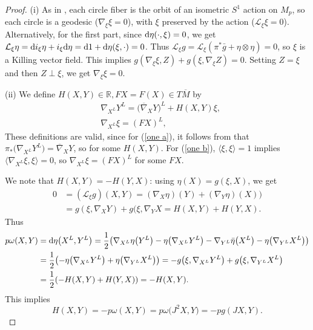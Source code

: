 \documentclass[10pt,a4paper]{amsart}
\numberwithin{equation}{section}
\theoremstyle{definition}
\newcommand{\BbR}{{\mathbb R}}
\newcommand{\R}{\BbR}
\newcommand{\bn}{\nabla}
\newcommand{\bxi}{\xi}
\newcommand{\bgg}{\bar g}
\newcommand{\bg}{ g}
\newcommand{\bx}{X}
\newcommand{\by}{Y}
\newcommand{\xl}{X^L}
\newcommand{\yl}{Y^L}
\newcommand{\om}{\overline{M}}
\newcommand{\omp}{M_p}
\begin{document}
\begin{proof}
(i) As in \cite[Section~3.2]{MRT4}, each circle fiber is the orbit of an isometric $S^1$ action on $\omp$, so each circle is a geodesic ($\bn_{\bxi}\bxi=0$), with $\bxi$ preserved by the action (${\mathcal L}_{\bxi} \bxi = 0$).
Alternatively, for the first part, since ${\rm d}\eta(\cdot, \bxi) = 0$, we get
$\mathcal L_{\bxi}\eta = {\rm d}i_{\bxi}\eta + i_{\bxi} {\rm d}\eta = {\rm d} 1 + {\rm d}\eta(\bxi,\cdot) = 0$.
Thus
$\mathcal L_{\bxi} \bg = \mathcal L_{\bxi} (\pi^*\bgg + \eta\otimes\eta) =0$, so $\bxi$ is a Killing vector field.
This implies $\bg(\bn_{\bxi}\bxi, Z) + \bg(\bxi, \bn_{\bxi}Z)=0$. Setting
 $Z = \bxi$ and then $Z\perp\bxi$, we get $\bn_{\bxi}\bxi = 0$.


(ii) We define $H(X,Y)\in \R, FX = F(X)\in T\om$ by
\begin{align}&\bn_{\xl} \yl= \bigl(\overline{\nabla}_XY\bigr)^L + H(X,Y)\bxi,\label{one a}\\
&\bn_{\xl} \bxi= (FX)^L,
\label{one b}
\end{align}
These definitions are valid, since for (\ref{one a}), it follows from \cite[Lemma 1]{oneill} that
$\pi_*\bigl(\bn_{\xl}\yl\bigr) = \overline{\nabla}_XY$, so
 for some $H(X,Y)$.
For (\ref{one b}),
$\langle\xi, \xi\rangle=1$ implies
$\langle\nabla_{X^{L}}\xi, \xi\rangle=0$,
so $\bn_{\xl} \bxi = (FX)^L$ for some $FX$.


We note that $H(X,Y) = -H(Y,X)$: using $\eta(\bx) = \bg(\bxi,\bx)$, we get
\begin{align*} 0&= (\mathcal L_{\bxi}g) (\bx,\by) = (\bn_{\bx}\eta)(\by) +
(\bn_{\by}\eta)(\bx))\\
&= \bg(\bxi, \bn_{\bx}\by) + \bg(\bxi, \bn_{\by}\bx = H(X,Y) + H(Y,X).
\end{align*}
Thus
\begin{align*} p\omega(X,Y) &= {\rm d} \eta\bigl(X^{L}, Y^{L}\bigr)
= \frac{1}{2}\bigl(\nabla_{X^{L}} \eta\bigl(Y^{L}\bigr) - \eta\bigl(\bn_{X^{L}}Y^{L}\bigr) - \nabla_{Y^{L}}\bar \eta\bigl(X^{L}\bigr) - \eta\bigl(\nabla_{Y^{L}}X^{L}\bigr) \bigr) \nonumber\\
 &= \frac{1}{2}\bigl(- \eta\bigl(\nabla_{X^{L}}Y^L\bigr) + \eta\bigl(\nabla_{Y^{L}}X^{L}\bigr) \bigr) = -\bg\bigl(\bxi,\nabla_{X^{L}}Y^L\bigr) +
 \bg\bigl(\bxi,\nabla_{Y^{L}}X^L\bigr) \nonumber\\
&= \frac{1}{2}(-H(X,Y) + H(Y,X))
= -H(X,Y).
 \end{align*}
 This implies
 \[H(X,Y) = -p\omega(X,Y) = p\omega\bigl(J^2X,Y\bigr) = -pg(JX,Y).\]



\end{proof}
\end{document}
